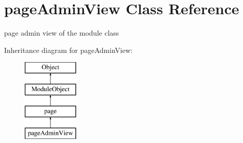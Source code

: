\hypertarget{classpageAdminView}{}\section{page\+Admin\+View Class Reference}
\label{classpageAdminView}


page admin view of the module class  


Inheritance diagram for page\+Admin\+View\+:\begin{figure}[H]
\begin{center}
\leavevmode
\includegraphics[height=4.000000cm]{classpageAdminView}
\end{center}
\end{figure}
